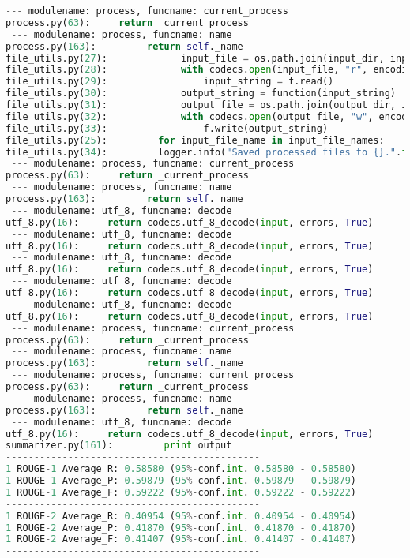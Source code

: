 \documentclass[11pt]{article}
\begin{document}
\begin{lstlisting}[language=Python]
 --- modulename: process, funcname: current_process
process.py(63):     return _current_process
 --- modulename: process, funcname: name
process.py(163):         return self._name
file_utils.py(27):             input_file = os.path.join(input_dir, input_file_name)
file_utils.py(28):             with codecs.open(input_file, "r", encoding="UTF-8") as f:
file_utils.py(29):                 input_string = f.read()
file_utils.py(30):             output_string = function(input_string)
file_utils.py(31):             output_file = os.path.join(output_dir, input_file_name)
file_utils.py(32):             with codecs.open(output_file, "w", encoding="UTF-8") as f:
file_utils.py(33):                 f.write(output_string)
file_utils.py(25):         for input_file_name in input_file_names:
file_utils.py(34):         logger.info("Saved processed files to {}.".format(output_dir))
 --- modulename: process, funcname: current_process
process.py(63):     return _current_process
 --- modulename: process, funcname: name
process.py(163):         return self._name
 --- modulename: utf_8, funcname: decode
utf_8.py(16):     return codecs.utf_8_decode(input, errors, True)
 --- modulename: utf_8, funcname: decode
utf_8.py(16):     return codecs.utf_8_decode(input, errors, True)
 --- modulename: utf_8, funcname: decode
utf_8.py(16):     return codecs.utf_8_decode(input, errors, True)
 --- modulename: utf_8, funcname: decode
utf_8.py(16):     return codecs.utf_8_decode(input, errors, True)
 --- modulename: utf_8, funcname: decode
utf_8.py(16):     return codecs.utf_8_decode(input, errors, True)
 --- modulename: process, funcname: current_process
process.py(63):     return _current_process
 --- modulename: process, funcname: name
process.py(163):         return self._name
 --- modulename: process, funcname: current_process
process.py(63):     return _current_process
 --- modulename: process, funcname: name
process.py(163):         return self._name
 --- modulename: utf_8, funcname: decode
utf_8.py(16):     return codecs.utf_8_decode(input, errors, True)
summarizer.py(161):         print output
---------------------------------------------
1 ROUGE-1 Average_R: 0.58580 (95%-conf.int. 0.58580 - 0.58580)
1 ROUGE-1 Average_P: 0.59879 (95%-conf.int. 0.59879 - 0.59879)
1 ROUGE-1 Average_F: 0.59222 (95%-conf.int. 0.59222 - 0.59222)
---------------------------------------------
1 ROUGE-2 Average_R: 0.40954 (95%-conf.int. 0.40954 - 0.40954)
1 ROUGE-2 Average_P: 0.41870 (95%-conf.int. 0.41870 - 0.41870)
1 ROUGE-2 Average_F: 0.41407 (95%-conf.int. 0.41407 - 0.41407)
---------------------------------------------

\end{lstlisting}
\end{document}
